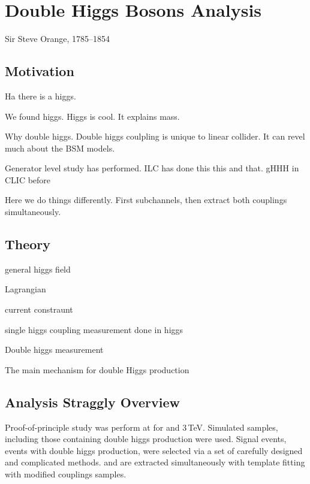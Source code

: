 \chapter{Double Higgs Bosons Analysis}
\label{chap:DoubleHiggs}

%
{Sir Steve Orange, 1785--1854}%

\section{Motivation}

Ha there is a higgs.

We found higgs. Higgs is cool. It explains mass.

Why double higgs. Double higgs coulpling is unique to linear collider. It can revel much about the BSM models.

Generator level study has performed. ILC has done this this and that. gHHH in CLIC before

Here we do things differently. First subchannels, then extract both couplings simultaneously.

\section{Theory}

general higgs field

Lagrangian

current constraunt

single higgs coupling measurement done in higgs

Double higgs measurement

The main mechanism for double Higgs production %

\section{Analysis Straggly Overview}

Proof-of-principle study was perform at \CLIC for  and 3\,TeV. Simulated samples, including those containing double higgs production were used. Signal events, events with double higgs production, were selected via a set of carefully designed and complicated methods. \gHHH and \gWWHH are extracted simultaneously with template fitting with modified couplings samples.
